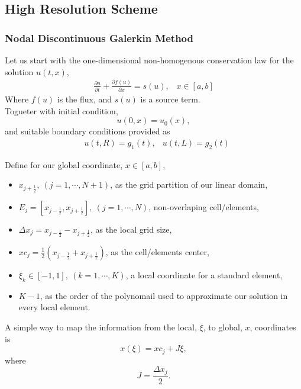 \subsection{High Resolution Scheme}
\begin{frame}
  \frametitle{Nodal Discontinuous Galerkin Method}
  Let us start with the one-dimensional non-homogenous conservation law for the solution $u(t,x)$,
  \begin{align}
    \frac{\partial u}{\partial t} + \frac{\partial f(u)}{\partial x} = s(u), \;\;\; x \in [a,b]
		\label{eq:non_homogeneous_consevationlaw}
  \end{align}	
  Where $f(u)$ is the flux, and $s(u)$ is a source term. \\
	Togueter with initial condition,
	\begin{equation}
		u(0,x) = u_0(x),
	\end{equation}
	and suitable boundary conditions provided as
	\begin{align}
	&u(t,R)=g_1(t), &u(t,L)=g_2(t) 
	\end{align}
\end{frame}

\begin{frame}
	Define for our global coordinate, $x \in [a,b]$,
	
	\begin{itemize}
		\item $x_{j+\frac{1}{2}}, \ (j=1,\cdots,N+1)$, as the grid partition of our linear domain,
		\item $E_j = [x_{j-\frac{1}{2}},x_{j+\frac{1}{2}}], \ (j=1,\cdots,N)$, non-overlaping cell/elements,
		\item $\Delta x_j = x_{j-\frac{1}{2}} - x_{j+\frac{1}{2}}$, as the local grid size,
		\item $xc_j = \frac{1}{2}(x_{j-\frac{1}{2}} + x_{j+\frac{1}{2}})$, as the cell/elements center,
		\item $\xi_k \in [-1,1], \ (k=1,\cdots,K)$, a local coordinate for a standard element,
		\item $K-1$, as the order of the polynomail used to approximate our solution in every local element.
	\end{itemize}
	A simple way to map the information from the local, $\xi$, to global, $x$, coordinates is
	\begin{equation}
		x(\xi) = xc_j + J\xi,
	\end{equation}
	where
	\begin{equation}
		J=\frac{\Delta x_j}{2}.
	\end{equation}
\end{frame}
	
